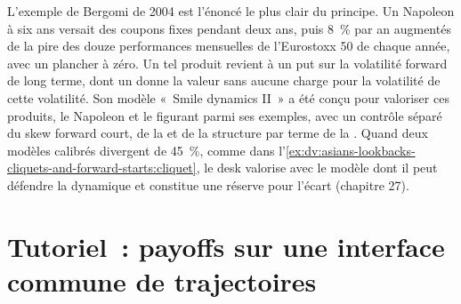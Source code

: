 L'exemple de Bergomi de 2004 est l'énoncé le plus clair du principe. Un Napoleon à six ans versait des coupons fixes pendant deux ans,
puis 8~\% par an augmentés de la pire des douze performances mensuelles de l'Eurostoxx 50 de chaque année, avec un plancher
à zéro. Un tel produit revient à un put sur la volatilité forward de long terme, dont un  donne la valeur
sans aucune charge pour la volatilité de cette volatilité. Son modèle «~Smile dynamics II~» a été conçu pour valoriser ces produits,
le Napoleon et le  figurant parmi ses exemples, avec un contrôle séparé du skew forward court, de la
 et de la structure par terme de la . Quand deux modèles calibrés divergent de
45~\%, comme dans l'\cref{ex:dv:asians-lookbacks-cliquets-and-forward-starts:cliquet}, le desk valorise avec le modèle dont
il peut défendre la dynamique et constitue une réserve pour l'écart (chapitre 27).

\section{Tutoriel~: payoffs sur une interface commune de trajectoires}\label{tut:dv:asians-lookbacks-cliquets-and-forward-starts:tut}

